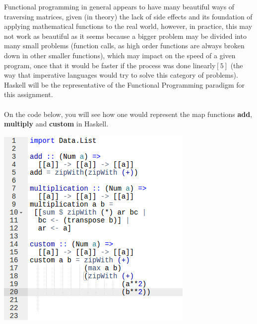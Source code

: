 \documentclass[conference]{IEEEtran}
\begin{document}
Functional programming in general appears to have many beautiful ways of traversing matrices, given (in theory) the lack of side effects and its foundation of applying mathematical functions to the real world, however, in practice, this may not work as beautiful as it seems because a bigger problem may be divided into many small problems (function calls, as high order functions are always broken down in other smaller functions), which may impact on the speed of a given program, once that it would be faster if the process was done linearly$[5]$ (the way that imperative languages would try to solve this category of problems). Haskell will be the representative of the Functional Programming paradigm for this assignment.
\\\\
On the code below, you will see how one would represent the map functions \textbf{add}, \textbf{multiply} and \textbf{custom} in Haskell.

\includegraphics[scale=0.60]{haskell_code}
\end{document}
